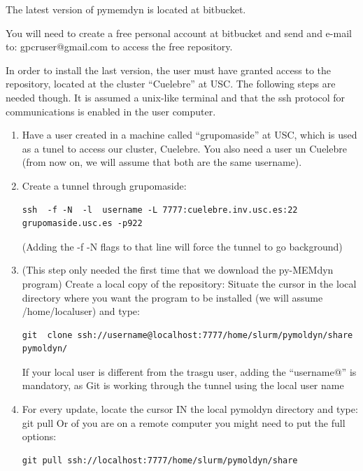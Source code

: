 \documentclass[10pt, oneside, pdftex]{article}
\begin{document}
The latest version of pymemdyn is located at bitbucket.


You will need to create a free personal account at bitbucket and send 
and e-mail to: gpcruser@gmail.com to access the free repository.


In  order to  install the  last version,  the user  must  have granted
access  to  the  repository,  located  at the  cluster  ``Cuelebre''  at
USC. The following steps are  needed though. It is assumed a unix-like
terminal and  that the ssh  protocol for communications is  enabled in
the  user  computer.  





\begin{enumerate}
\item{Have  a user  created  in  a machine  called
``grupomaside'' at USC, which is used  as a tunel to access our cluster,
Cuelebre.  You also  need a  user un  Cuelebre (from  now on,  we will
assume that both are the same username).}

\item{Create a  tunnel through  grupomaside: 
\begin{Verbatim}
ssh  -f -N  -l  username -L 7777:cuelebre.inv.usc.es:22 grupomaside.usc.es -p922 
\end{Verbatim}
(Adding  the -f -N  flags to  that line  will force  the tunnel  to go
background)}

\item{(This  step  only needed  the  first  time  that we  download  the
py-MEMdyn program) Create a local  copy of the repository: Situate the
cursor  in  the local  directory  where you  want  the  program to  be
installed  (we  will  assume  /home/localuser)  and  type:
\begin{Verbatim}
git  clone ssh://username@localhost:7777/home/slurm/pymoldyn/share  pymoldyn/  
\end{Verbatim}
If your  local  user  is  different  from the  trasgu  user,  adding  the
``username@'' is mandatory,  as Git is working through  the tunnel using
the local user name}

\item{For every update, locate the cursor IN the local pymoldyn directory
and type: git pull  Or of you are on a remote  computer you might need
to       put       the        full       options:
\begin{Verbatim}
git pull ssh://localhost:7777/home/slurm/pymoldyn/share
\end{Verbatim}
}


\end{enumerate}
\end{document}
